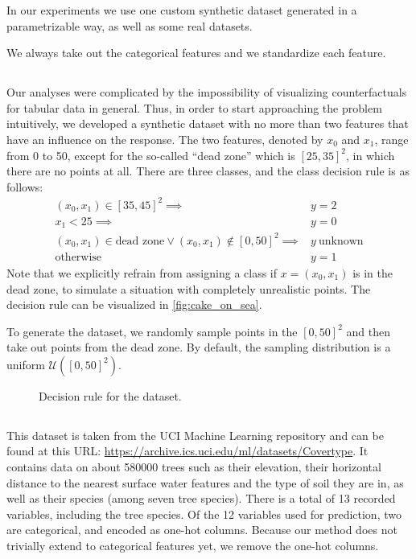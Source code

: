 \documentclass[../main.tex]{subfiles}
\begin{document}
In our experiments we use one custom synthetic dataset generated in a parametrizable way, as well as some real datasets.

We always take out the categorical features and we standardize each feature.

\subsection{\CakeOnSea}

Our analyses were complicated by the impossibility of visualizing counterfactuals for tabular data in general.
Thus, in order to start approaching the problem intuitively, we developed a synthetic dataset with no more than two features that have an influence on the response.
The two features, denoted by $x_0$ and $x_1$, range from 0 to 50, except for the so-called ``dead zone'' which is $[25, 35]^2$, in which there are no points at all.
There are three classes, and the class decision rule is as follows:
\begin{align*}
    (x_0, x_1) \in [35, 45]^2 \implies & y = 2 \\
    x_1 < 25                  \implies & y = 0 \\
    (x_0, x_1) \in \text{dead zone} \lor (x_0, x_1) \notin [0, 50]^2  \implies & y\ \text{unknown} \\
    \text{otherwise} \qquad            & y = 1
\end{align*}
Note that we explicitly refrain from assigning a class if $x = (x_0, x_1)$ is in the dead zone, to simulate a situation with completely unrealistic points.
The decision rule can be visualized in \autoref{fig:cake_on_sea}.

To generate the dataset, we randomly sample points in the $[0, 50]^2$ and then take out points from the dead zone. By default, the sampling distribution is a uniform $\mathcal{U}([0, 50]^2)$.

\begin{figure}[h]
    \centering
    
\caption{Decision rule for the \CakeOnSea dataset.}
    \label{fig:cake_on_sea}
\end{figure}

\subsection{\ForestCover}

This dataset is taken from the UCI Machine Learning repository \cite{duaUCI2019} and can be found at this URL: \url{https://archive.ics.uci.edu/ml/datasets/Covertype}. 
It contains data on about 580000 trees such as their elevation, their horizontal distance to the nearest surface water features and the type of soil they are in, as well as their species (among seven tree species). There is a total of 13 recorded variables, including the tree species. Of the 12 variables used for prediction, two are categorical, and encoded as one-hot columns.
Because our method does not trivially extend to categorical features yet, we remove the one-hot columns.
\end{document}
